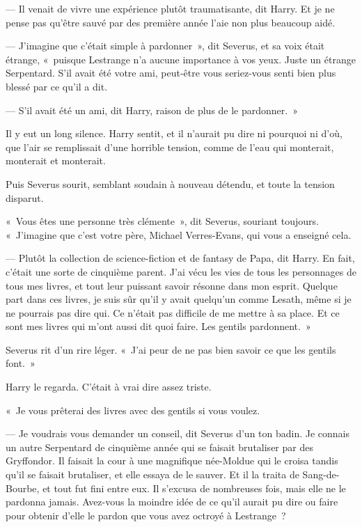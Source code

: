 --- Il venait de vivre une expérience plutôt traumatisante, dit Harry. Et je ne pense pas qu'être sauvé par des première année l'aie non plus beaucoup aidé.

--- J'imagine que c'était simple à pardonner~», dit Severus, et sa voix était étrange, «~puisque Lestrange n'a aucune importance à vos yeux. Juste un étrange Serpentard. S'il avait été votre ami, peut-être vous seriez-vous senti bien plus blessé par ce qu'il a dit.

--- S'il avait été un ami, dit Harry, raison de plus de le pardonner.~»

Il y eut un long silence. Harry sentit, et il n'aurait pu dire ni pourquoi ni d'où, que l'air se remplissait d'une horrible tension, comme de l'eau qui monterait, monterait et monterait.

Puis Severus sourit, semblant soudain à nouveau détendu, et toute la tension disparut.

«~Vous êtes une personne très clémente~», dit Severus, souriant toujours. «~J'imagine que c'est votre père, Michael Verres-Evans, qui vous a enseigné cela.

--- Plutôt la collection de science-fiction et de fantasy de Papa, dit Harry. En fait, c'était une sorte de cinquième parent. J'ai vécu les vies de tous les personnages de tous mes livres, et tout leur puissant savoir résonne dans mon esprit. Quelque part dans ces livres, je suis sûr qu'il y avait quelqu'un comme Lesath, même si je ne pourrais pas dire qui. Ce n'était pas difficile de me mettre à sa place. Et ce sont mes livres qui m'ont aussi dit quoi faire. Les gentils pardonnent.~»

Severus rit d'un rire léger. «~J'ai peur de ne pas bien savoir ce que les gentils font.~»

Harry le regarda. C'était à vrai dire assez triste.

«~Je vous prêterai des livres avec des gentils si vous voulez.

--- Je voudrais vous demander un conseil, dit Severus d'un ton badin. Je connais un autre Serpentard de cinquième année qui se faisait brutaliser par des Gryffondor. Il faisait la cour à une magnifique née-Moldue qui le croisa tandis qu'il se faisait brutaliser, et elle essaya de le sauver. Et il la traita de Sang-de-Bourbe, et tout fut fini entre eux. Il s'excusa de nombreuses fois, mais elle ne le pardonna jamais. Avez-vous la moindre idée de ce qu'il aurait pu dire ou faire pour obtenir d'elle le pardon que vous avez octroyé à Lestrange~?

